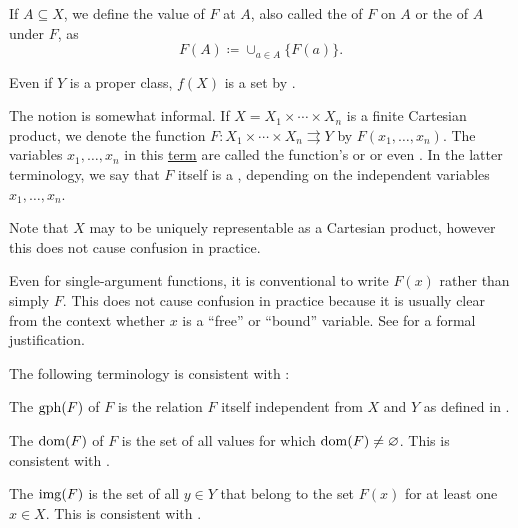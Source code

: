 \begin{definition}
\begin{defenum}[series=def:function]
     If \( A \subseteq X \), we define the value of \( F \) at \( A \), also called the  of \( F \) on \( A \) or the  of \( A \) under \( F \), as
    \begin{equation*}
      F(A) \coloneqq \cup_{a \in A} \{ F(a) \}.
    \end{equation*}

    Even if \( Y \) is a proper class, \( f(X) \) is a set by .

     The notion  is somewhat informal. If \( X = X_1 \times \cdots \times X_n \) is a finite Cartesian product, we denote the function \( F: X_1 \times \cdots \times X_n \rightrightarrows Y \) by \( F(x_1, \ldots, x_n) \). The variables \( x_1, \ldots, x_n \) in this \hyperref[def:first_order_syntax/term]{term} are called the function's  or  or even . In the latter terminology, we say that \( F \) itself is a , depending on the independent variables \( x_1, \ldots, x_n \).

    Note that \( X \) may to be uniquely representable as a Cartesian product, however this does not cause confusion in practice.

    Even for single-argument functions, it is conventional to write \( F(x) \) rather than simply \( F \). This does not cause confusion in practice because it is usually clear from the context whether \( x \) is a \enquote{free} or \enquote{bound} variable. See  for a formal justification.
  \end{defenum}

  The following terminology is consistent with :
  \begin{defenum}[resume=def:function]
     The  \( \operatorname{gph}(F) \) of \( F \) is the relation \( F \) itself independent from \( X \) and \( Y \) as defined in .

     The  \( \operatorname{dom}(F) \) of \( F \) is the set of all values for which \( \operatorname{dom}(F) \neq \varnothing \). This is consistent with .

     The  \( \operatorname{img}(F) \) is the set of all \( y \in Y \) that belong to the set \( F(x) \) for at least one \( x \in X \). This is consistent with .


\end{defenum}
\end{definition}
